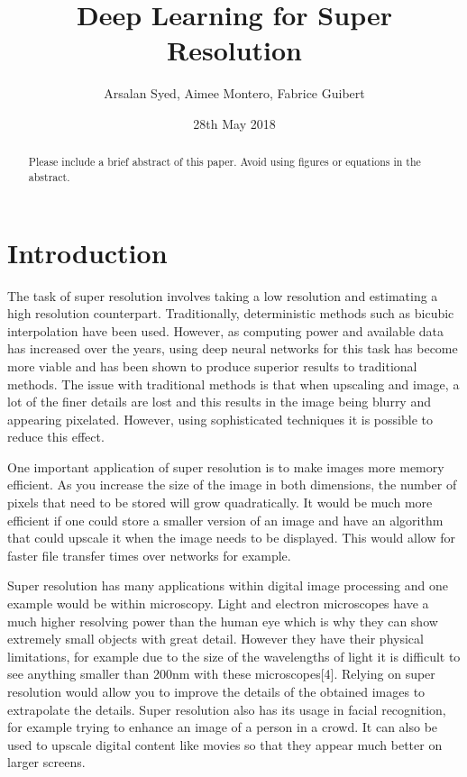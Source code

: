 \documentclass[letterpaper,twocolumn,fleqn]{article}
\title{Deep Learning for Super Resolution}
\author{ Arsalan Syed, Aimee Montero,  Fabrice Guibert}
\date{28th May 2018} %
\begin{document}
 

\maketitle 

\thispagestyle{empty} %


\begin{abstract}
Please include a brief abstract of this paper. Avoid using figures or
equations in the abstract.
\end{abstract}




\section{Introduction}

The task of super resolution involves taking a low resolution and estimating a high resolution
counterpart. Traditionally, deterministic methods such as bicubic interpolation have been used.
However, as computing power and available data has increased over the years, using deep neural
networks for this task has become more viable and has been shown to produce superior results to
traditional methods. The issue with traditional methods is that when upscaling and image, a lot of the
finer details are lost and this results in the image being blurry and appearing pixelated. However, using
sophisticated techniques it is possible to reduce this effect.

One important application of super resolution is to make images more memory efficient. As you
increase the size of the image in both dimensions, the number of pixels that need to be stored will grow
quadratically. It would be much more efficient if one could store a smaller version of an image and have
an algorithm that could upscale it when the image needs to be displayed. This would allow for faster file
transfer times over networks for example.

Super resolution has many applications within digital image processing and one example would be
within microscopy. Light and electron microscopes have a much higher resolving power than the human
eye which is why they can show extremely small objects with great detail. However they have their 
physical limitations, for example due to the size of the wavelengths of light it is difficult to see anything
smaller than 200nm with these microscopes[4]. Relying on super resolution would allow you to improve
the details of the obtained images to extrapolate the details. Super resolution also has its usage in facial
recognition, for example trying to enhance an image of a person in a crowd. It can also be used to
upscale digital content like movies so that they appear much better on larger screens.
\end{document}
